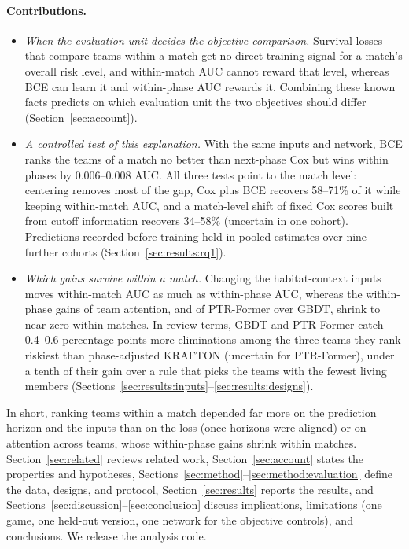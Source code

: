 \documentclass[sigconf,anonymous]{acmart}
\begin{document}
\paragraph{Contributions.}
\begin{itemize}
\item \emph{When the evaluation unit decides the objective comparison.} Survival losses that compare teams within a match get no direct training signal for a match's overall risk level, and within-match AUC cannot reward that level, whereas BCE can learn it and within-phase AUC rewards it. Combining these known facts predicts on which evaluation unit the two objectives should differ (Section~\ref{sec:account}).
\item \emph{A controlled test of this explanation.} With the same inputs and network, BCE ranks the teams of a match no better than next-phase Cox but wins within phases by 0.006--0.008 AUC. All three tests point to the match level: centering removes most of the gap, Cox plus BCE recovers 58--71\% of it while keeping within-match AUC, and a match-level shift of fixed Cox scores built from cutoff information recovers 34--58\% (uncertain in one cohort). Predictions recorded before training held in pooled estimates over nine further cohorts (Section~\ref{sec:results:rq1}).
\item \emph{Which gains survive within a match.} Changing the habitat-context inputs moves within-match AUC as much as within-phase AUC, whereas the within-phase gains of team attention, and of PTR-Former over GBDT, shrink to near zero within matches. In review terms, GBDT and PTR-Former catch 0.4--0.6 percentage points more eliminations among the three teams they rank riskiest than phase-adjusted KRAFTON (uncertain for PTR-Former), under a tenth of their gain over a rule that picks the teams with the fewest living members (Sections~\ref{sec:results:inputs}--\ref{sec:results:designs}).
\end{itemize}
In short, ranking teams within a match depended far more on the prediction horizon and the inputs than on the loss (once horizons were aligned) or on attention across teams, whose within-phase gains shrink within matches.
Section~\ref{sec:related} reviews related work, Section~\ref{sec:account} states the properties and hypotheses, Sections~\ref{sec:method}--\ref{sec:method:evaluation} define the data, designs, and protocol, Section~\ref{sec:results} reports the results, and Sections~\ref{sec:discussion}--\ref{sec:conclusion} discuss implications, limitations (one game, one held-out version, one network for the objective controls), and conclusions. We release the analysis code.
\end{document}
